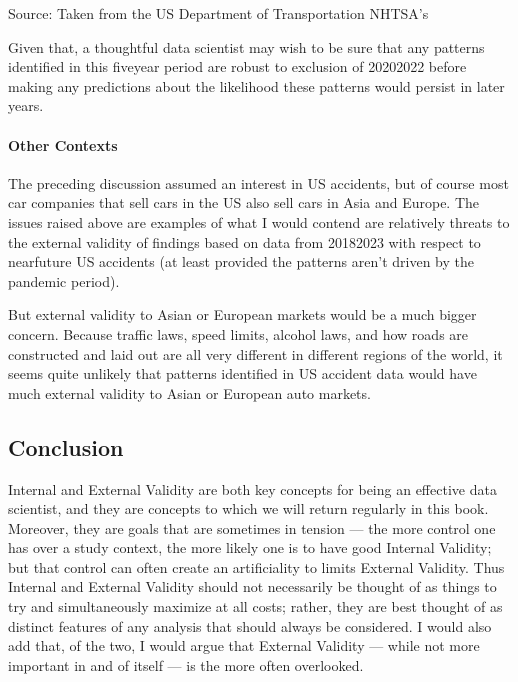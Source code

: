 \documentclass[letterpaper,10pt,english]{jupyterBook}
\begin{document}
\sphinxAtStartPar
Source: Taken from the US Department of Transportation NHTSA’s 

\sphinxAtStartPar
Given that, a thoughtful data scientist may wish to be sure that any patterns identified in this five\sphinxhyphen{}year period are robust to exclusion of 2020\sphinxhyphen{}2022 before making any predictions about the likelihood these patterns would persist in later years.


\paragraph{Other Contexts}
\label{\detokenize{30_questions/17_exploratory_questions_internal_external:other-contexts}}
\sphinxAtStartPar
The preceding discussion assumed an interest in US accidents, but of course most car companies that sell cars in the US also sell cars in Asia and Europe. The issues raised above are examples of what I would contend are relatively  threats to the external validity of findings based on data from 2018\sphinxhyphen{}2023 with respect to near\sphinxhyphen{}future US accidents (at least provided the patterns aren’t driven by the pandemic period).

\sphinxAtStartPar
But external validity to Asian or European markets would be a much bigger concern. Because traffic laws, speed limits, alcohol laws, and how roads are constructed and laid out are all very different in different regions of the world, it seems quite unlikely that patterns identified in US accident data would have much external validity to Asian or European auto markets.


\subsection{Conclusion}
\label{\detokenize{30_questions/17_exploratory_questions_internal_external:conclusion}}
\sphinxAtStartPar
Internal and External Validity are both key concepts for being an effective data scientist, and they are concepts to which we will return regularly in this book. Moreover, they are goals that are sometimes in tension — the more control one has over a study context, the more likely one is to have good Internal Validity; but that control can often create an artificiality to limits External Validity. Thus Internal and External Validity should not necessarily be thought of as things to try and simultaneously maximize at all costs; rather, they are best thought of as distinct features of any analysis that should always be considered. I would also add that, of the two, I would argue that External Validity — while not more important in and of itself — is the more often overlooked.
\end{document}
